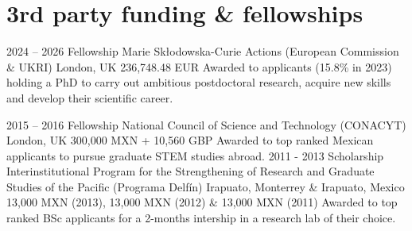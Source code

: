 \documentclass[]{friggeri-cv} %
\begin{document}
%
%
%
%
%


\section{3rd party funding \& fellowships}

\begin{entrylist}
\entry
{2024 -- 2026}
{Fellowship}
{Marie Skłodowska-Curie Actions (European Commission \& UKRI)}
{London, UK}
{{\normalsize  236,748.48 EUR}}
{Awarded to applicants (15.8\% in 2023) holding a PhD to carry out ambitious postdoctoral research, acquire new skills and develop their scientific career.}

\entry
{2015 -- 2016}
{Fellowship}
{National Council of Science and Technology (CONACYT)}
{London, UK}
{{\normalsize 300,000 MXN + 10,560 GBP}}
{Awarded to top ranked Mexican applicants to pursue graduate STEM studies abroad.}
\entry
{2011 - 2013}
{Scholarship}
{Interinstitutional Program for the Strengthening of Research and Graduate Studies of the Pacific (Programa Delfín)}
{Irapuato, Monterrey \& Irapuato, Mexico}
{{\normalsize 13,000 MXN (2013), 13,000 MXN (2012) \& 13,000 MXN (2011)}}
{Awarded to top ranked BSc applicants for a 2-months intership in a research lab of their choice.}
\end{entrylist}
\end{document}
